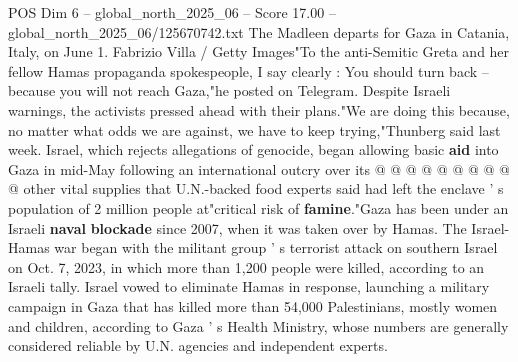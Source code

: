 \begin{textsample}{POS Dim 6 – global\_north\_2025\_06 – Score 17.00 – global\_north\_2025\_06/125670742.txt}
The Madleen departs for Gaza in Catania, Italy, on June 1.
Fabrizio Villa / Getty Images"To the anti-Semitic Greta and her fellow Hamas propaganda spokespeople, I say clearly : You should turn back -- because you will not reach Gaza,"he posted on Telegram.
Despite Israeli warnings, the activists pressed ahead with their plans."We are doing this because, no matter what odds we are against, we have to keep trying,"Thunberg said last week.
Israel, which rejects allegations of genocide, began allowing basic \textbf{aid} into Gaza in mid-May following an international outcry over its @ @ @ @ @ @ @ @ @ @ other vital supplies that U.N.-backed food experts said had left the enclave ' s population of 2 million people at"critical risk of \textbf{famine}."Gaza has been under an Israeli \textbf{naval} \textbf{blockade} since 2007, when it was taken over by Hamas.
The Israel-Hamas war began with the militant group ' s terrorist attack on southern Israel on Oct. 7, 2023, in which more than 1,200 people were killed, according to an Israeli tally.
Israel vowed to eliminate Hamas in response, launching a military campaign in Gaza that has killed more than 54,000 Palestinians, mostly women and children, according to Gaza ' s Health Ministry, whose numbers are generally considered reliable by U.N. agencies and independent experts.

\end{textsample}
